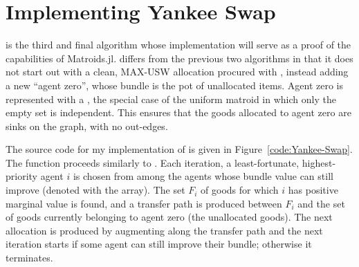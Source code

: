 \section{Implementing Yankee Swap}
 is the third and final algorithm whose implementation will serve as a proof of the capabilities of Matroids.jl.  differs from the previous two algorithms in that it does not start out with a clean, MAX-USW allocation procured with , instead adding a new ``agent zero'', whose bundle is the pot of unallocated items. Agent zero is represented with a , the special case of the uniform matroid in which only the empty set is independent. This ensures that the goods allocated to agent zero are sinks on the graph, with no out-edges.

The source code for my implementation of  is given in Figure~\ref{code:Yankee-Swap}. The function proceeds similarly to . Each iteration, a least-fortunate, highest-priority agent $i$ is chosen from among the agents whose bundle value can still improve (denoted with the  array). The set $F_i$ of goods for which $i$ has positive marginal value is found, and a transfer path is produced between $F_i$ and the set of goods currently belonging to agent zero (the unallocated goods). The next allocation is produced by augmenting along the transfer path and the next iteration starts if some agent can still improve their bundle; otherwise it terminates.

